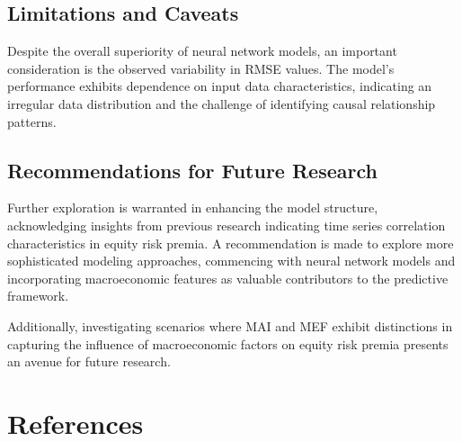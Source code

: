 \documentclass{article}
\begin{document}
\subsection{Limitations and Caveats}

Despite the overall superiority of neural network models, an important consideration is the observed variability in RMSE values. The model's performance exhibits dependence on input data characteristics, indicating an irregular data distribution and the challenge of identifying causal relationship patterns.

\subsection{Recommendations for Future Research}

Further exploration is warranted in enhancing the model structure, acknowledging insights from previous research indicating time series correlation characteristics in equity risk premia. A recommendation is made to explore more sophisticated modeling approaches, commencing with neural network models and incorporating macroeconomic features as valuable contributors to the predictive framework.

Additionally, investigating scenarios where MAI and MEF exhibit distinctions in capturing the influence of macroeconomic factors on equity risk premia presents an avenue for future research. 

\newpage

\section{References}

\end{document}
